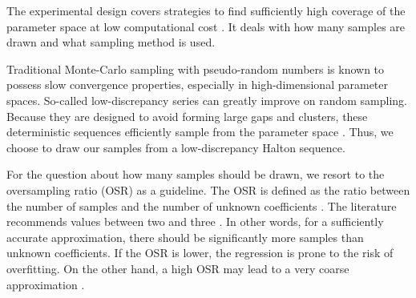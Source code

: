 


The experimental design covers strategies to find sufficiently high coverage
of the parameter space at low computational cost \cite{fajraoui_optimal_2017,usher_value_2015}.
It deals with how many samples are drawn and what sampling method is used.


Traditional Monte-Carlo sampling with pseudo-random numbers is known to
possess slow convergence properties, %
especially in high-dimensional parameter spaces.
So-called low-discrepancy series can greatly improve on random sampling.
Because they are designed to avoid forming large gaps and clusters,
these deterministic sequences efficiently sample from the parameter space \cite{fajraoui_optimal_2017}.
Thus, we choose to draw our samples from a low-discrepancy Halton sequence.


For the question about how many samples should be drawn,
we resort to the oversampling ratio (OSR) as a guideline.
The OSR is defined as the ratio between the number of samples
and the number of unknown coefficients \cite{palar_multi-fidelity_2016}.
The literature recommends values between two and three \cite{hosder2007,palar_multi-fidelity_2016,fajraoui_optimal_2017,gratiet_metamodel-based_2015}.
In other words, for a sufficiently accurate approximation,
there should be significantly more samples than unknown coefficients.
If the OSR is lower, the regression is prone to the risk of overfitting.
On the other hand, a high OSR may lead to a very coarse approximation \cite{palar_multi-fidelity_2016}.

